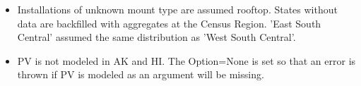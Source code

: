 \begin{itemize}
\item Installations of unknown mount type are assumed rooftop. States without data are backfilled with aggregates at the Census Region. 'East South Central' assumed the same distribution as 'West South Central'.
\item PV is not modeled in AK and HI. The Option=None is set so that an error is thrown if PV is modeled as an argument will be missing.
\end{itemize}
